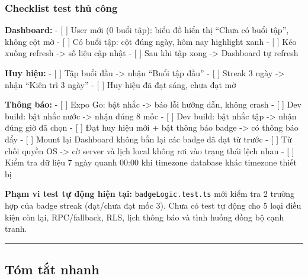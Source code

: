 \documentclass[12pt,a4paper]{article}
\providecommand{\passthrough}[1]{#1}
\begin{document}
\subsubsection{Checklist test thủ
công}\label{checklist-test-thux1ee7-cuxf4ng}

\textbf{Dashboard:} - {[} {]} User mới (0 buổi tập): biểu đồ hiển thị
``Chưa có buổi tập'', không cột mờ - {[} {]} Có buổi tập: cột đúng ngày,
hôm nay highlight xanh - {[} {]} Kéo xuống refresh -\textgreater{} số
liệu cập nhật - {[} {]} Sau khi tập xong -\textgreater{} Dashboard tự
refresh

\textbf{Huy hiệu:} - {[} {]} Tập buổi đầu -\textgreater{} nhận ``Buổi
tập đầu'' - {[} {]} Streak 3 ngày -\textgreater{} nhận ``Kiên trì 3
ngày'' - {[} {]} Huy hiệu đã đạt sáng, chưa đạt mờ

\textbf{Thông báo:} - {[} {]} Expo Go: bật nhắc -\textgreater{} báo lỗi
hướng dẫn, không crash - {[} {]} Dev build: bật nhắc nước
-\textgreater{} nhận đúng 8 mốc - {[} {]} Dev build: bật nhắc tập
-\textgreater{} nhận đúng giờ đã chọn - {[} {]} Đạt huy hiệu mới + bật
thông báo badge -\textgreater{} có thông báo đẩy - {[} {]} Mount lại
Dashboard không bắn lại các badge đã đạt từ trước - {[} {]} Từ chối
quyền OS -\textgreater{} cờ server và lịch local không rơi vào trạng
thái lệch nhau - {[} {]} Kiểm tra dữ liệu 7 ngày quanh 00:00 khi
timezone database khác timezone thiết bị

\textbf{Phạm vi test tự động hiện tại:}
\passthrough{\lstinline!badgeLogic.test.ts!} mới kiểm tra 2 trường hợp
của badge streak (đạt/chưa đạt mốc 3). Chưa có test tự động cho 5 loại
điều kiện còn lại, RPC/fallback, RLS, lịch thông báo và tình huống đồng
bộ cạnh tranh.

\begin{center}\rule{0.5\linewidth}{0.5pt}\end{center}

\subsection{Tóm tắt nhanh}\label{tuxf3m-tux1eaft-nhanh}
\end{document}
